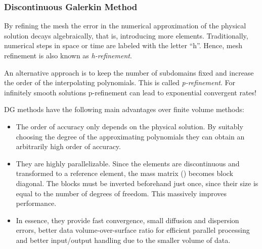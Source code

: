 \subsubsection{Discontinuous Galerkin Method}
\label{sec:polyonome-ansatz}

By refining the mesh the error in the numerical approximation of the physical
solution decays algebraically, that is, introducing more elements.
Traditionally, numerical steps in space or time are labeled with the letter
``h''. Hence, mesh refinement is also known as \emph{h-refinement}.




An alternative approach is to keep the number of subdomains fixed and increase
the order of the interpolating polynomials. This is called \emph{p-refinement}.
For infinitely smooth solutions p-refinement can lead to exponential convergent
rates!

DG methods have the following main advantages over finite volume methods:
\begin{itemize}
\item The order of accuracy only depends on the physical solution. By suitably
choosing the degree of the approximating polynomials they can obtain an
arbitrarily high order of accuracy.

\item They are highly parallelizable. Since the elements are discontinuous and
transformed to a reference element, the mass matrix () becomes
block diagonal. The blocks must be inverted beforehand just once, since their
size is equal to the number of degrees of freedom. This massively improves
performance.



\item In essence, they provide fast convergence, small diffusion and dispersion
errors, better data volume-over-surface ratio for efficient parallel processing
and better input/output handling due to the smaller volume of data.
\end{itemize}

